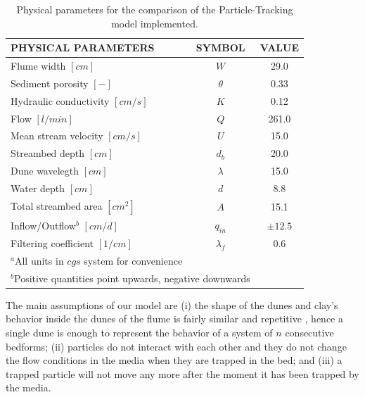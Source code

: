 \documentclass[draft,linenumbers]{agujournal2018}
\begin{document}
\begin{table}
\caption{Physical parameters \citep{Packman2000,Fox2014,Fox2018} for the comparison of the Particle-Tracking model implemented.}
\label{TF:Phys_Param}
\centering
\begin{tabular}{l c c}
\hline
PHYSICAL PARAMETERS						& SYMBOL			& VALUE			\\
\hline
  Flume width $[cm]$  					& $W$				& 29.0 			\\
  Sediment porosity $[-]$				& $\theta$			& 0.33 			\\
  Hydraulic conductivity $[cm/s]$ 		& $K$				& 0.12 			\\
  Flow $[l/min]$						& $Q$				& 261.0			\\
  Mean stream velocity $[cm/s]$			& $U$				& 15.0 			\\
  Streambed depth $[cm]$				& $d_b$				& 20.0 			\\
  Dune wavelegth $[cm]$					& $\lambda$			& 15.0 			\\
  Water depth $[cm]$					& $d$				& 8.8 			\\
  Total streambed area $[cm^{2}]$		& $A$				& 15.1	 		\\
  Inflow/Outflow$^{b}$ $[cm/d]$			& $q_{in}$			& $\pm 12.5$	\\
  Filtering coefficient $[1/cm]$		& $\lambda_f$		& 0.6			\\
\hline
\multicolumn{2}{l}{$^{a}$All units in $cgs$ system for convenience} \\
\multicolumn{2}{l}{$^{b}$Positive quantities point upwards, negative 
downwards} \\
\end{tabular}
\end{table}

The main assumptions of our model are (i) the shape of the dunes and clay's behavior inside the dunes of the flume is fairly similar and repetitive \citep{Vanoni1974}, hence a single dune is enough to represent the behavior of a system of $n$ consecutive bedforms; (ii) particles do not interact with each other and they do not change the flow conditions in the media when they are trapped in the bed; and (iii) a trapped particle will not move any more after the moment it has been trapped by the media.
\end{document}

